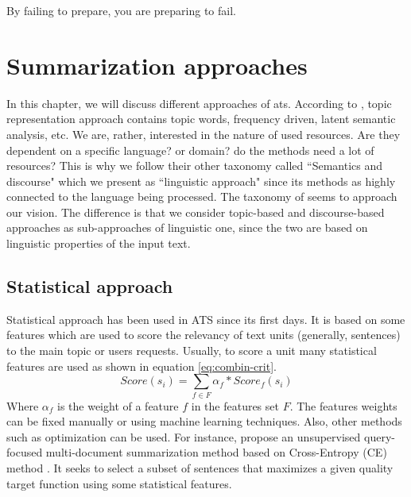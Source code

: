 \begin{savequote}[75mm] 
By failing to prepare, you are preparing to fail.
\end{savequote}

\chapter{Summarization approaches}
\label{chap:app}



In this chapter, we will discuss different approaches of \ac{ats}. 
According to \citet{12-nenkova-mckeown}, topic representation approach contains topic words, frequency driven, latent semantic analysis, etc. 
We are, rather, interested in the nature of used resources.
Are they dependent on a specific language? or domain? do the methods need a lot of resources?
This is why we follow their other taxonomy \citep{11-nenkova-mckeown} called ``Semantics and discourse" which we present as ``linguistic approach" since its methods as highly connected to the language being processed.
The taxonomy of \citet{12-lloret-palomar} seems to approach our vision. 
The difference is that we consider topic-based and discourse-based approaches as sub-approaches of linguistic one, since the two are based on linguistic properties of the input text.

\section{Statistical approach}

Statistical approach has been used in ATS since its first days. 
It is based on some features which are used to score the relevancy of text units (generally, sentences) to the main topic or users requests. 
Usually, to score a unit many statistical features are used as shown in equation \ref{eq:combin-crit}.
\begin{equation}
	\label{eq:combin-crit}
	Score(s_i) = \sum_{f \in F}{\alpha_f * Score_f(s_i)}
\end{equation}
Where $ \alpha_f $ is the weight of a feature $ f $ in the features set $ F $.
The features weights can be fixed manually or using machine learning techniques.
Also, other methods such as optimization can be used. 
For instance, \citep{17-feigenblat-al} propose an unsupervised query-focused multi-document summarization method based on Cross-Entropy (CE) method \citep{04-rubinstein-kroese}. 
It seeks to select a subset of sentences that maximizes a given quality target function using some statistical features.


